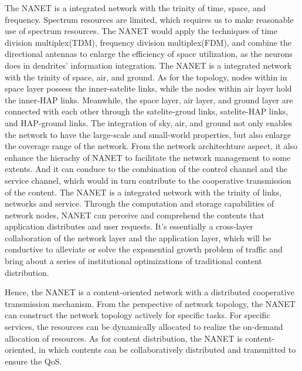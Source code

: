 \documentclass[journal,comsoc]{IEEEtran}
\begin{document}
				The NANET is a integrated network with the trinity of time, space, and frequency.
				Spectrum resources are limited, which requires us to make reasonable use of spectrum resources.
				The NANET would apply the techniques of time division multiplex(TDM)\cite{spirit1994optical}, frequency division multiplex(FDM)\cite{weinstein1971data}, and combine the directional antennas to enlarge the efficiency of space utilization, as the neurons does in dendrites' information integration.
				The NANET is a integrated network with the trinity of space, air, and ground. 
				As for the topology, nodes within in space layer possess the inner-satelite links, while the nodes within air layer hold the inner-HAP links.
				Meanwhile, the space layer, air layer, and ground layer are connected with each other through the satelite-groud links, satelite-HAP links, and HAP-ground links.
				The integration of sky, air, and ground not only enables the network to have the large-scale and small-world properties, but also enlarge the coverage range of the network.
				From the network architechture aspect, it also enhance the hierachy of NANET to facilitate the network management to some extents.
				And it can conduce to the combination of the control channel and the service channel, which would in turn contribute to the cooperative transmission of the content.
				The NANET is a integrated network with the trinity of links, networks and service.
				Through the computation and storage capabilities of network nodes, NANET can perceive and comprehend the contents that application distributes and user requests.
				It's essentially a cross-layer collaboration of the network layer and the application layer, which will be conductive to alleviate or solve the exponential growth problem of traffic and bring about a series of  institutional optimizations of traditional content distribution.
				
				Hence, the NANET is a content-oriented network with a distributed cooperative transmission mechanism.
				From the perspective of network topology, the NANET can construct the network topology actively for specific tasks.
				For specific services, the resources can be dynamically allocated to realize the on-demand allocation of resources.
				As for content distribution, the NANET is content-oriented, in which contents can be collaboratively distributed and  transmitted to ensure the QoS.
\end{document}
